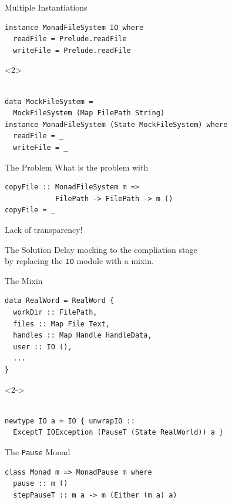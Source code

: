 \documentclass[aspectratio=169]{beamer}
\begin{document}
\begin{frame}[fragile]{Multiple Instantiations}
\begin{verbatim}
instance MonadFileSystem IO where
  readFile = Prelude.readFile
  writeFile = Prelude.readFile
\end{verbatim}
\begin{visibleenv}<2>
\begin{verbatim}

data MockFileSystem =
  MockFileSystem (Map FilePath String)
instance MonadFileSystem (State MockFileSystem) where
  readFile = _
  writeFile = _
\end{verbatim}
\end{visibleenv}
\end{frame}

\begin{frame}[fragile]{The Problem}
What is the problem with
\begin{verbatim}
copyFile :: MonadFileSystem m =>
            FilePath -> FilePath -> m ()
copyFile = _
\end{verbatim}
\pause
\vfill
\begin{center}
  \alert{\Large Lack of transparency!}
\end{center}
\end{frame}

\begin{frame}{The Solution}
  \large
  Delay mocking to the compliation stage\\[1.5em]
  \pause
  \qquad by replacing the \texttt{IO} module with a mixin.
\end{frame}

\begin{frame}[fragile]{The Mixin}
\begin{verbatim}
data RealWord = RealWord {
  workDir :: FilePath,
  files :: Map File Text,
  handles :: Map Handle HandleData,
  user :: IO (),
  ...
}
\end{verbatim}
\begin{visibleenv}<2->
\begin{verbatim}

newtype IO a = IO { unwrapIO ::
  ExceptT IOException (PauseT (State RealWorld)) a }
\end{verbatim}
\end{visibleenv}
\end{frame}

\begin{frame}[fragile]{The \texttt{Pause} Monad}
\begin{verbatim}
class Monad m => MonadPause m where
  pause :: m ()
  stepPauseT :: m a -> m (Either (m a) a)
\end{verbatim}
\end{frame}
\end{document}
